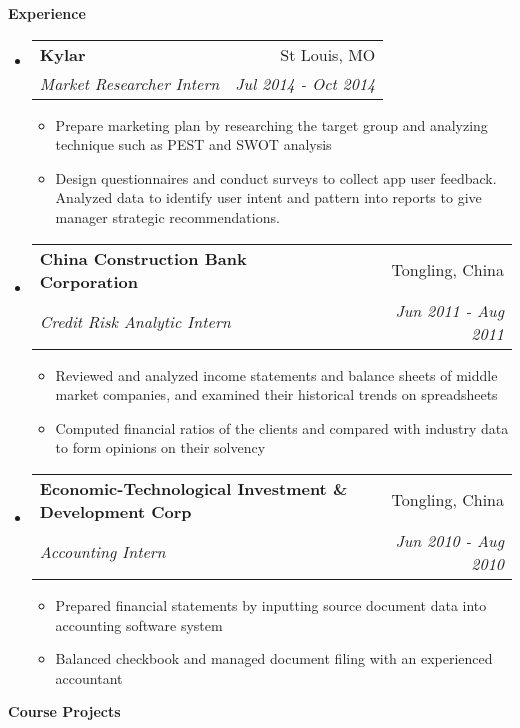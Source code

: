 \documentclass[a4paper,10pt]{article}
\makeatletter
\newcommand{\resitem}[1]{\item #1 \vspace{-2pt}}
\newcommand{\resheading}[1]{{\large \colorbox{mygrey}{\begin{minipage}{\textwidth}{\textbf{#1\vphantom{p\^{E}}}}\end{minipage}}}}
\newcommand{\ressubheading}[4]{
\begin{tabular*}{172mm}{l@{\extracolsep{\fill}}r}
		\textbf{#1} & #2 \\
		\textit{#3} & \textit{#4} \\
\end{tabular*}\vspace{-6pt}}
\makeatother
\begin{document}
\resheading{Experience}
\begin{itemize}

\item 
	\ressubheading{Kylar}{St Louis, MO}{Market Researcher Intern}{Jul 2014 - Oct 2014}
	\begin{itemize}
		\resitem{Prepare marketing plan by researching the target group and analyzing technique such as PEST
and SWOT analysis}
		\resitem{Design questionnaires and conduct surveys to collect app user feedback. Analyzed data to identify user intent and pattern
into reports to give manager strategic recommendations.  }
		
	\end{itemize}

\item 
	\ressubheading{China Construction Bank Corporation}{Tongling, China}{Credit Risk Analytic Intern}{Jun 2011 - Aug 2011}
	\begin{itemize}
		\resitem{Reviewed and analyzed income statements and balance sheets of middle market companies, and examined their historical trends on spreadsheets}
		\resitem{Computed financial ratios of the clients and compared with industry data to form opinions on their solvency}
	\end{itemize}


\item
	\ressubheading{Economic-Technological Investment \& Development Corp}{Tongling, China}{Accounting Intern}{Jun 2010 - Aug 2010}
	\begin{itemize}
		\resitem{Prepared financial statements by inputting source document data into accounting software system  }
		\resitem{Balanced checkbook and managed document filing with an experienced accountant }	
        
	\end{itemize}



\end{itemize}


\resheading{Course Projects}
\end{document}
